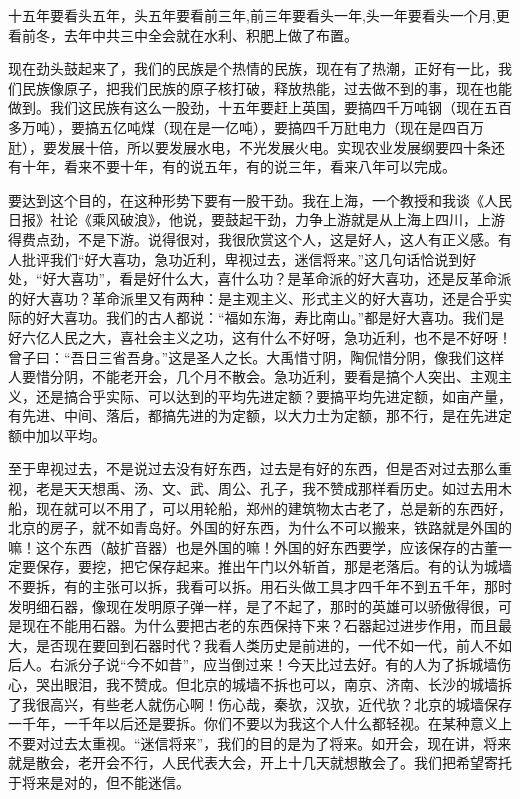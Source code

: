十五年要看头五年，头五年要看前三年,前三年要看头一年,头一年要看头一个月,更看前冬，去年中共三中全会就在水利、积肥上做了布置。

现在劲头鼓起来了，我们的民族是个热情的民族，现在有了热潮，正好有一比，我们民族像原子，把我们民族的原子核打破，释放热能，过去做不到的事，现在也能做到。我们这民族有这么一股劲，十五年要赶上英国，要搞四千万吨钢（现在五百多万吨），要搞五亿吨煤（现在是一亿吨），要搞四千万瓧电力（现在是四百万瓧），要发展十倍，所以要发展水电，不光发展火电。实现农业发展纲要四十条还有十年，看来不要十年，有的说五年，有的说三年，看来八年可以完成。

要达到这个目的，在这种形势下要有一股干劲。我在上海，一个教授和我谈《人民日报》社论《乘风破浪》，他说，要鼓起干劲，力争上游就是从上海上四川，上游得费点劲，不是下游。说得很对，我很欣赏这个人，这是好人，这人有正义感。有人批评我们“好大喜功，急功近利，卑视过去，迷信将来。”这几句话恰说到好处，“好大喜功”，看是好什么大，喜什么功？是革命派的好大喜功，还是反革命派的好大喜功？革命派里又有两种：是主观主义、形式主义的好大喜功，还是合乎实际的好大喜功。我们的古人都说：“福如东海，寿比南山。”都是好大喜功。我们是好六亿人民之大，喜社会主义之功，这有什么不好呀，急功近利，也不是不好呀！曾子曰：“吾日三省吾身。”这是圣人之长。大禹惜寸阴，陶侃惜分阴，像我们这样人要惜分阴，不能老开会，几个月不散会。急功近利，要看是搞个人突出、主观主义，还是搞合乎实际、可以达到的平均先进定额？要搞平均先进定额，如亩产量，有先进、中间、落后，都搞先进的为定额，以大力士为定额，那不行，是在先进定额中加以平均。

至于卑视过去，不是说过去没有好东西，过去是有好的东西，但是否对过去那么重视，老是天天想禹、汤、文、武、周公、孔子，我不赞成那样看历史。如过去用木船，现在就可以不用了，可以用轮船，郑州的建筑物太古老了，总是新的东西好，北京的房子，就不如青岛好。外国的好东西，为什么不可以搬来，铁路就是外国的嘛！这个东西（敲扩音器）也是外国的嘛！外国的好东西要学，应该保存的古董一定要保存，要挖，把它保存起来。推出午门以外斩首，那是老落后。有的认为城墙不要拆，有的主张可以拆，我看可以拆。用石头做工具才四千年不到五千年，那时发明细石器，像现在发明原子弹一样，是了不起了，那时的英雄可以骄傲得很，可是现在不能用石器。为什么要把古老的东西保持下来？石器起过进步作用，而且最大，是否现在要回到石器时代？我看人类历史是前进的，一代不如一代，前人不如后人。右派分子说“今不如昔”，应当倒过来！今天比过去好。有的人为了拆城墙伤心，哭出眼泪，我不赞成。但北京的城墙不拆也可以，南京、济南、长沙的城墙拆了我很高兴，有些老人就伤心啊！伤心哉，秦欤，汉欤，近代欤？北京的城墙保存一千年，一千年以后还是要拆。你们不要以为我这个人什么都轻视。在某种意义上不要对过去太重视。“迷信将来”，我们的目的是为了将来。如开会，现在讲，将来就是散会，老开会不行，人民代表大会，开上十几天就想散会了。我们把希望寄托于将来是对的，但不能迷信。

